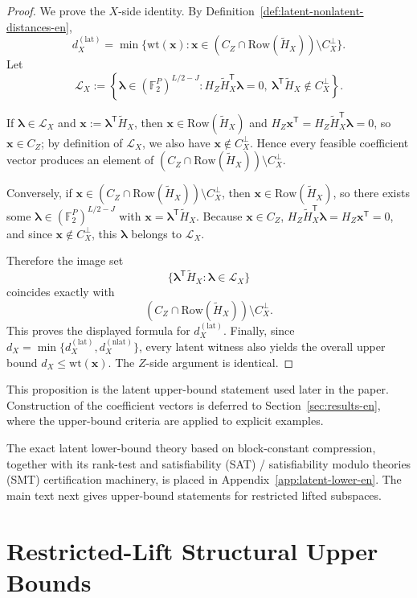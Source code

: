 \documentclass[11pt]{article}
\newcommand{\Ftwo}{\mathbb{F}_2}
\newcommand{\Row}{\mathrm{Row}}
\newcommand{\wt}{\mathrm{wt}}
\newcommand{\Htil}{\tilde{H}}
\newcommand{\vect}[1]{\bm{#1}}
\newcommand{\vx}{\vect{x}}
\newcommand{\vlambda}{\vect{\lambda}}
\theoremstyle{uprightthm}
\begin{document}
\begin{proof}
We prove the $X$-side identity. By Definition~\ref{def:latent-nonlatent-distances-en},
\[
d_X^{(\mathrm{lat})}
=
\min\{\wt(\vx):\vx\in (C_Z\cap \Row(\Htil_X))\setminus C_X^\perp\}.
\]
Let
\[
\mathcal{L}_X
:=
\left\{
\vlambda\in(\Ftwo^P)^{L/2-J}:
H_Z\Htil_X^{\mathsf T}\vlambda=0,\ 
\vlambda^{\mathsf T}\Htil_X\notin C_X^\perp
\right\}.
\]

If $\vlambda\in\mathcal{L}_X$ and $\vx:=\vlambda^{\mathsf T}\Htil_X$, then
$\vx\in\Row(\Htil_X)$ and
$H_Z\vx^{\mathsf T}=H_Z\Htil_X^{\mathsf T}\vlambda=0$,
so $\vx\in C_Z$; by definition of $\mathcal{L}_X$, we also have
$\vx\notin C_X^\perp$.
Hence every feasible coefficient vector produces an element of
$(C_Z\cap \Row(\Htil_X))\setminus C_X^\perp$.

Conversely, if $\vx\in (C_Z\cap \Row(\Htil_X))\setminus C_X^\perp$,
then $\vx\in\Row(\Htil_X)$, so there exists some
$\vlambda\in(\Ftwo^P)^{L/2-J}$ with
$\vx=\vlambda^{\mathsf T}\Htil_X$.
Because $\vx\in C_Z$,
$H_Z\Htil_X^{\mathsf T}\vlambda=H_Z\vx^{\mathsf T}=0$,
and since $\vx\notin C_X^\perp$, this $\vlambda$ belongs to $\mathcal{L}_X$.

Therefore the image set
\[
\{\vlambda^{\mathsf T}\Htil_X:\vlambda\in\mathcal{L}_X\}
\]
coincides exactly with
\[
(C_Z\cap \Row(\Htil_X))\setminus C_X^\perp.
\]
This proves the displayed formula for $d_X^{(\mathrm{lat})}$.
Finally, since
$d_X=\min\{d_X^{(\mathrm{lat})},d_X^{(\mathrm{nlat})}\}$,
every latent witness also yields the overall upper bound $d_X\le \wt(\vx)$.
The $Z$-side argument is identical.
\end{proof}

This proposition is the latent upper-bound statement used later in the paper.
Construction of the coefficient vectors is deferred to
Section~\ref{sec:results-en}, where the upper-bound criteria are applied to
explicit examples.

The exact latent lower-bound theory based on block-constant compression, together
with its rank-test and satisfiability (SAT) / satisfiability modulo theories (SMT) certification machinery, is placed in
Appendix~\ref{app:latent-lower-en}.  The main text next gives upper-bound
statements for restricted lifted subspaces.

\section{Restricted-Lift Structural Upper Bounds}
\label{sec:nonlatent-structural-en}
\end{document}
